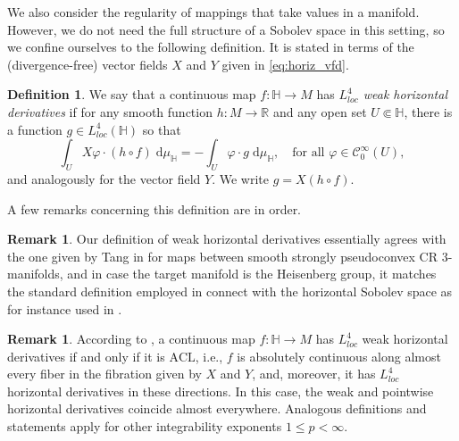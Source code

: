 \documentclass[10pt,letterpaper]{amsart}
\theoremstyle{definition}
\newtheorem{remark}[thm]{Remark}
\newtheorem{definition}[thm]{Definition}
\numberwithin{thm}{subsection}
\numberwithin{equation}{section}
\begin{document}
We also consider the regularity of mappings that take values in a
manifold. However, we do not need the full structure of a Sobolev
space in this setting, so we confine ourselves to the following
definition. It is stated in terms of the (divergence-free) vector
fields $X$ and $Y$ given in \eqref{eq:horiz_vfd}.

\begin{definition}
We say that a continuous map $f:{\mathbb H} \to M$ has
\emph{$L^4_{loc}$ weak horizontal derivatives} if for any smooth
function $h:M \to \mathbb{R}$ and any open set $U \Subset
{\mathbb H}$, there is a function $g\in L^4_{loc}({\mathbb H})$
so that
\begin{displaymath}
 \int_U X\varphi \cdot (h\circ f) \; \mathrm{d}\mu_{\mathbb H} = - \int_U \varphi \cdot g \; \mathrm{d}\mu_{\mathbb H},\quad \text{for all }\varphi\in \mathcal{C}^{\infty}_0(U),
\end{displaymath}
and analogously for the vector field $Y$. We write $g = X(h \circ
f)$.
\end{definition}

A few remarks concerning this definition are in order.

\begin{remark}
Our definition of weak horizontal derivatives essentially agrees with the one given by Tang in \cite[\S2]{MR1404088}
for maps between smooth strongly pseudoconvex CR $3$-manifolds,
and in case the target manifold is the Heisenberg group, it
matches the standard definition employed in connect with the horizontal Sobolev space
as for instance used in \cite{Da}.
\end{remark}

\begin{remark}\label{r:ACL_char}
According to \cite[Theorem 2.2]{MR1404088}, a continuous map
$f:{\mathbb H} \to M$ has  {$L^4_{loc}$ weak horizontal derivatives} if
and only if it is $\mathrm{ACL}$, i.e., $f$ is absolutely
continuous along almost every fiber in the fibration given by $X$
and $Y$, and, moreover, it has $L^4_{loc}$ horizontal derivatives
in these directions. In this case, the weak and pointwise
horizontal derivatives coincide almost everywhere. Analogous
definitions  and statements apply for other integrability
exponents $1\leq p <\infty$.
\end{remark}
\end{document}
